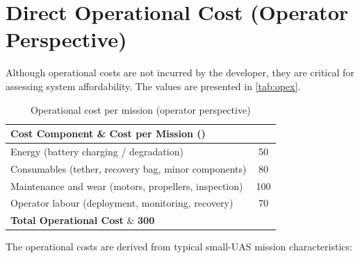 \section{Direct Operational Cost (Operator Perspective)}

Although operational costs are not incurred by the developer, they are critical for assessing system affordability. The values are presented in \autoref{tab:opex}.

\begin{table}[h]
\centering
\setlength{\tabcolsep}{4pt}
\renewcommand{\arraystretch}{0.9}
\caption{Operational cost per mission (operator perspective)}
\vspace{-5pt}
\label{tab:opex}
\begin{tabular}{lc}
\toprule
\textbf{Cost Component} \& \textbf{Cost per Mission (\texteuro{})} \\
\midrule
Energy (battery charging / degradation) & 50 \\
Consumables (tether, recovery bag, minor components) & 80 \\
Maintenance and wear (motors, propellers, inspection) & 100 \\
Operator labour (deployment, monitoring, recovery) & 70 \\
\midrule
\textbf{Total Operational Cost} \& \textbf{300} \\
\bottomrule
\end{tabular}
\end{table}

The operational costs are derived from typical small-UAS mission characteristics:

